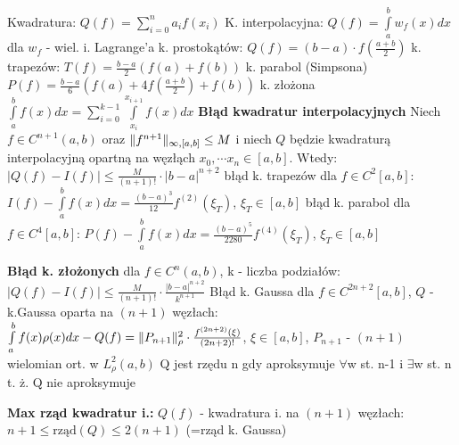 
\entry
Kwadratura:
	\(
		Q(f) = \sum\limits_{i=0}^n a_if(x_i)
    \)
\entry
K. interpolacyjna:
    \(
        Q(f) = \int\limits_a^bw_f(x)dx
	\) dla $w_f$ - wiel. i. Lagrange'a
\entry
k. prostokątów:
	\(
		Q(f) = (b-a)\cdot f(\frac{a+b}{2})
	\)
\entry
k. trapezów:
	\(
		T(f) = \frac{b-a}{2}(f(a)+f(b))
	\)
\entry
k. parabol (Simpsona)
	\(
		P(f) = \frac{b-a}{6}(f(a) + 4f(\frac{a+b}{2})+f(b))
	\)
\entry
k. złożona
    \(
        \int\limits_a^b f(x)dx = \sum_{i=0}^{k-1} \int\limits_{x_i}^{x_{i+1}} f(x)dx
    \)
\entry
\textbf{Błąd kwadratur interpolacyjnych}
	Niech $f \in C^{n+1}(a, b)$ oraz $\|f^{n+1}\|_{\infty, [a, b]} \leq M$ i niech $Q$ będzie kwadraturą interpolacyjną opartną na węzłąch $x_0, \cdots x_n \in [a, b]$. Wtedy:
	\(
		|Q(f) - I(f)| \leq \frac{M}{(n+1)!} \cdot |b-a|^{n+2}
	\)
\entry
błąd k. trapezów dla $f \in C^2[a, b]$:
	\(
		I(f) - \int\limits_a^bf(x)dx = \frac{(b-a)^3}{12}f^{(2)}(\xi_T)
	\), $\xi_T \in [a, b]$
\entry
błąd k. parabol dla $f \in C^4[a, b]$:
	\(
		P(f) - \int\limits_a^bf(x)dx = \frac{(b-a)^5}{2280}f^{(4)}(\xi_T)
	\), $\xi_T \in [a, b]$

\entry
\textbf{Błąd k. złożonych} dla $f \in C^{n}(a, b)$, k - liczba podziałów:
    \(
        |Q(f) - I(f)| \leq \frac{M}{(n+1)!} \cdot \frac{|b-a|^{n+2}}{k^{n+1}}
    \)
\entry
Błąd k. Gaussa dla $f \in  C^{2n+2}[a, b]$, $Q$ - k.Gaussa oparta na $(n+1)$ węzłach:
	\(
		\int\limits_a^b f(x)\rho(x)dx - Q(f) = \|P_{n+1}\|^2_\rho\cdot \frac{f^{(2n+2)}(\xi)}{(2n+2)!}
	\), $\xi \in [a, b]$, $P_{n+1}$ - $(n+1)$ wielomian ort. w $L^2_\rho(a, b)$
\entry
Q jest rzędu n gdy aproksymuje $\forall$w st. n-1 i $\exists$w st. n t. ż. Q nie aproksymuje

\entry
\textbf{Max rząd kwadratur i.:} $Q(f)$ - kwadratura i. na $(n+1)$ węzłach:
\(
	n+1 \leq \textrm{rząd}(Q) \leq 2(n+1)
\) (=rząd k. Gaussa)

